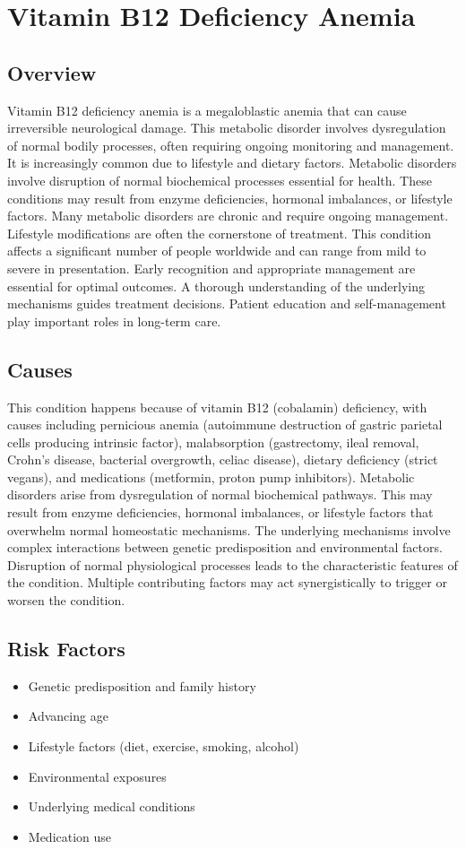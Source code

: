 \chapter{Vitamin B12 Deficiency Anemia}
\label{sec:Vitamin B12 Deficiency Anemia}

\section{Overview}
Vitamin B12 deficiency anemia is a megaloblastic anemia that can cause irreversible neurological damage. This metabolic disorder involves dysregulation of normal bodily processes, often requiring ongoing monitoring and management. It is increasingly common due to lifestyle and dietary factors. Metabolic disorders involve disruption of normal biochemical processes essential for health. These conditions may result from enzyme deficiencies, hormonal imbalances, or lifestyle factors. Many metabolic disorders are chronic and require ongoing management. Lifestyle modifications are often the cornerstone of treatment. This condition affects a significant number of people worldwide and can range from mild to severe in presentation. Early recognition and appropriate management are essential for optimal outcomes. A thorough understanding of the underlying mechanisms guides treatment decisions. Patient education and self-management play important roles in long-term care.
\section{Causes}
This condition happens because of vitamin B12 (cobalamin) deficiency, with causes including pernicious anemia (autoimmune destruction of gastric parietal cells producing intrinsic factor), malabsorption (gastrectomy, ileal removal, Crohn's disease, bacterial overgrowth, celiac disease), dietary deficiency (strict vegans), and medications (metformin, proton pump inhibitors). Metabolic disorders arise from dysregulation of normal biochemical pathways. This may result from enzyme deficiencies, hormonal imbalances, or lifestyle factors that overwhelm normal homeostatic mechanisms. The underlying mechanisms involve complex interactions between genetic predisposition and environmental factors. Disruption of normal physiological processes leads to the characteristic features of the condition. Multiple contributing factors may act synergistically to trigger or worsen the condition.
\section{Risk Factors}
\begin{itemize}[noitemsep]
  \item Genetic predisposition and family history
  \item Advancing age
  \item Lifestyle factors (diet, exercise, smoking, alcohol)
  \item Environmental exposures
  \item Underlying medical conditions
  \item Medication use
\end{itemize}
